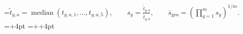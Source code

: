 \documentclass[11pt]{article}
\begin{document}
=\hbox{$\displaystyle \widetilde{t}_{g,a}=\operatorname{median}(t_{g,a,1},\ldots,t_{g,a,5}),\qquad s_g=\frac{\widetilde{t}_{g,a}}{\widetilde{t}_{g,b}},\qquad \overline{s}_{\mathrm{geo}}=\left(\prod_{g=1}^{m}s_g\right)^{1/m}.$}
\pdfpagewidth=\dimexpr{}+4pt\relax
\pdfpageheight=\dimexpr{}++4pt\relax
\hoffset=-1in
\voffset=-1in
\shipout\vbox{\kern2pt\hbox{\kern2pt\kern2pt}\kern2pt}
\end{document}
